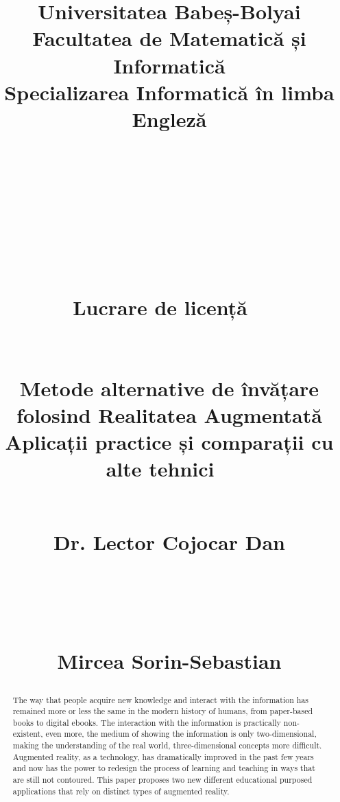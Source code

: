 \documentclass[12 pct]{report}
\begin{document}
\begin{titlepage}
\title{%
  { \huge Universitatea Babeș-Bolyai\\
  Facultatea de Matematică și Informatică\\
  Specializarea Informatică în limba Engleză \\
  }
  \ \\
  \ \\
  \ \\
  \ \\
  \ \\
  \ \\
  {\huge Lucrare de licență}
  \ \\
  \ \\
  \ \\
  Metode alternative de învățare folosind Realitatea Augmentată\\
  Aplicații practice și comparații cu alte tehnici
  \ \\
  \ \\
  {%
    \begin{flushleft}%
  	 Dr. Lector  Cojocar Dan
  	\end{flushleft}}
  \ \\
  \ \\
  {%
  \begin{flushright}
  	Mircea Sorin-Sebastian
  \end{flushright} }
}%
\maketitle
\end{titlepage}

\begin{abstract}
The way that people acquire new knowledge and interact with the information has remained more or less the same in the modern history of humans, from paper-based books to digital ebooks. The interaction with the information is practically non-existent, even more, the medium of showing the information is only two-dimensional, making the understanding of the real world, three-dimensional concepts more difficult. Augmented reality, as a technology, has dramatically improved in the past few years and now has the power to redesign the process of learning and teaching in ways that are still not contoured. This paper proposes two new different educational purposed applications that rely on distinct types of augmented reality.
\end{abstract}

\tableofcontents
\end{document}

